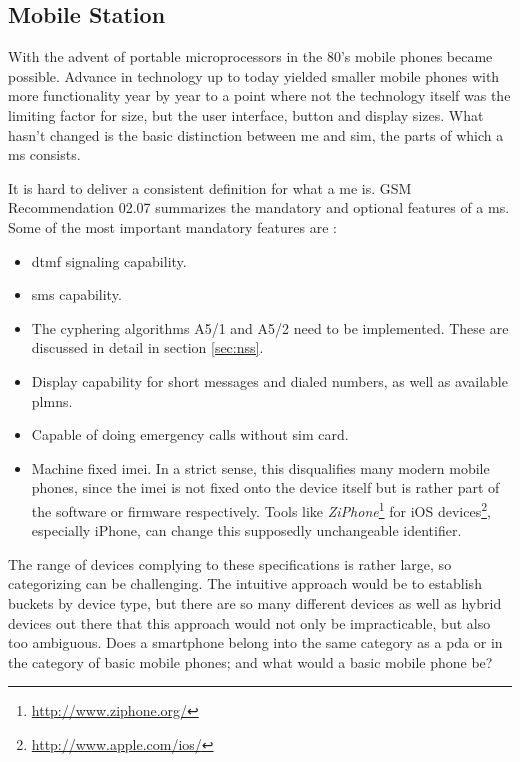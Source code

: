\subsection{Mobile Station}
\label{sec:ms}
With the advent of portable microprocessors in the 80's mobile phones became possible.
Advance in technology up to today yielded smaller mobile phones with more functionality year by year to a point where not the technology itself was the limiting factor for size, but the user interface, \eg button and display sizes.
What hasn't changed is the basic distinction between \gls{me} and \gls{sim}, the parts of which a \gls{ms} consists.

It is hard to deliver a consistent definition for what a \gls{me} is.
GSM Recommendation 02.07 \cite{GSM0207} summarizes the mandatory and optional features of a \gls{ms}.
Some of the most important mandatory features are \cite{protocols1999}:
\begin{itemize}
	\item \gls{dtmf} signaling capability.
	\item \gls{sms} capability.
	\item The cyphering algorithms A5/1 and A5/2 need to be implemented. 
	These are discussed in detail in section \ref{sec:nss}.
	\item Display capability for short messages and dialed numbers, as well as available \gls{plmn}s.
	\item Capable of doing emergency calls without \gls{sim} card.
	\item Machine fixed \gls{imei}.
	In a strict sense, this disqualifies many modern mobile phones, since the \gls{imei} is not fixed onto the device itself but is rather part of the software or firmware respectively.
	Tools like \emph{ZiPhone}\footnote{\url{http://www.ziphone.org/}} for iOS devices\footnote{\url{http://www.apple.com/ios/}}, especially iPhone, can change this supposedly unchangeable identifier.
\end{itemize}

The range of devices complying to these specifications is rather large, so categorizing can be challenging.
The intuitive approach would be to establish buckets by device type, but there are so many different devices as well as hybrid devices out there that this approach would not only be impracticable, but also too ambiguous.
Does a smartphone belong into the same category as a \gls{pda} or in the category of basic mobile phones; and what would a basic mobile phone be?

